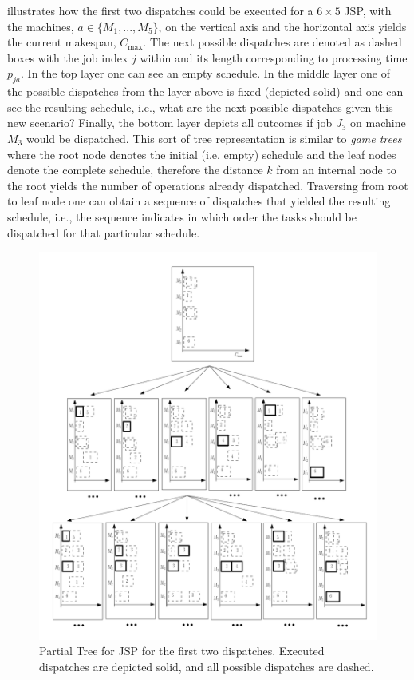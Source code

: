 \documentclass[smallextended]{llncs}
\begin{document}
 illustrates how the first two dispatches could be executed for a $6\times 5$ JSP, with the machines, $a\in\{M_1,...,M_5\}$, on the vertical axis and the horizontal axis yields the current makespan, $C_{\max}$. The next possible dispatches are denoted as dashed boxes with the job index $j$ within and its length corresponding to processing time $p_{ja}$.
In the top layer one can see an empty schedule.
In the middle layer one of the possible dispatches from the layer above is fixed (depicted solid) and one can see the resulting 
schedule, i.e., what are the next possible dispatches given this new scenario? Finally, the bottom layer depicts all outcomes if job $J_3$ on machine $M_3$ would be dispatched. 
This sort of tree representation is similar 
to \emph{game trees} \cite{vonNeumann44} where the root node denotes the initial (i.e. empty) schedule and the leaf nodes 
denote the complete schedule, therefore the distance $k$ from an internal node to the root yields the number of 
operations already dispatched. Traversing from root to leaf node one can obtain a sequence of dispatches that yielded 
the resulting schedule, i.e., the sequence indicates in which order the tasks should be dispatched for that particular 
schedule. 

\begin{figure}[t!]
\includegraphics[width=\columnwidth]{figures/gametree}
\caption[Partial Game Tree for JSP]{Partial Tree for JSP for the first two dispatches. 
Executed dispatches are depicted solid, and all possible dispatches are dashed.}
\label{fig:jssp:gametree}
\end{figure}
\end{document}
